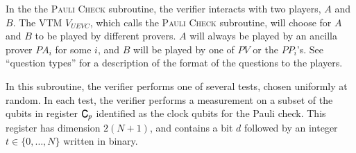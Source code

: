 	In the the \textsc{Pauli Check} subroutine, the verifier interacts with two players, $A$ and $B$. The VTM $V_{UEVC}$, which calls the \textsc{Pauli Check} subroutine, will choose for $A$ and $B$ to be played by different provers. $A$ will always be played by an ancilla prover $PA_i$ for some $i$, and $B$ will be played by one of $PV$ or the $PP_i$'s. See ``question types'' for a description of the format of the questions to the players.
		
	In this subroutine, the verifier performs one of several tests, chosen uniformly at random. In each test, the verifier performs a measurement on a subset of the qubits in register ${\textsf{C}}_{p}$ identified as the clock qubits for the Pauli check. This register has dimension $2(N+1)$, and contains a bit $d$ followed by an integer $t\in\{0,\ldots,N\}$ written in binary. %


